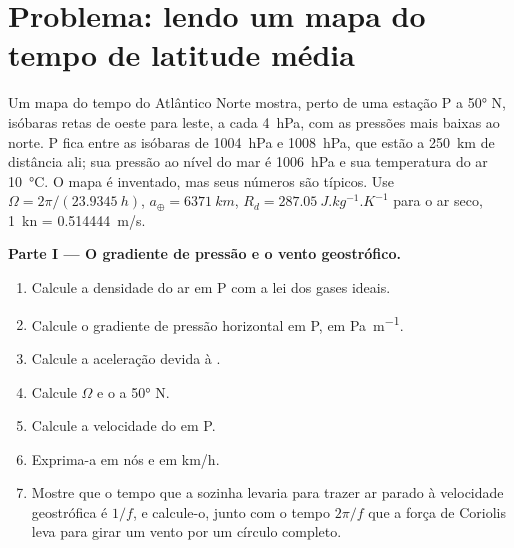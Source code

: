 \section{Problema: lendo um mapa do tempo de latitude média}

\begin{problem}
\label{pb:b1:atmospheric-circulation:1}
Um mapa do tempo do Atlântico Norte mostra, perto de uma estação P a \ang{50} N, isóbaras retas de
oeste para leste, a cada \qty{4}{hPa}, com as pressões mais baixas ao norte. P fica entre as isóbaras
de \qty{1004}{hPa} e \qty{1008}{hPa}, que estão a \qty{250}{km} de distância ali; sua pressão ao nível
do mar é \qty{1006}{hPa} e sua temperatura do ar \qty{10}{\degreeCelsius}. O mapa é inventado, mas seus
números são típicos. Use $\Omega = 2\pi/(\qty{23.9345}{h})$, $a_\oplus = \qty{6371}{km}$, $R_d =
\qty{287.05}{J.kg^{-1}.K^{-1}}$ para o ar seco, \qty{1}{kn} = \qty{0.514444}{m/s}.

\medskip
\noindent\textbf{Parte I --- O gradiente de pressão e o vento geostrófico.}
\begin{enumerate}
  \item Calcule a densidade do ar em P com a lei dos gases ideais.
  \item Calcule o gradiente de pressão horizontal em P, em \unit{Pa.m^{-1}}.
  \item Calcule a aceleração devida à .
  \item Calcule $\Omega$ e o  a \ang{50} N.
  \item Calcule a velocidade do  em P.
  \item Exprima-a em nós e em \unit{km/h}.
  \item Mostre que o tempo que a  sozinha levaria para trazer ar parado
        à velocidade geostrófica é $1/f$, e calcule-o, junto com o tempo $2\pi/f$ que a força de Coriolis
        leva para girar um vento por um círculo completo.
\end{enumerate}


\end{problem}
